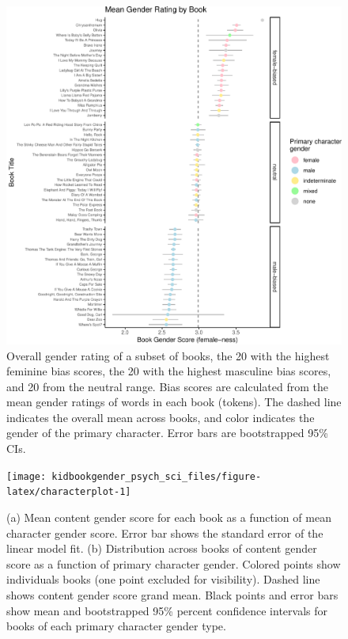 \documentclass[
  english,
  ,man,floatsintext]{apa6}
\begin{document}
\begin{figure}[b]
\includegraphics{kidbookgender_psych_sci_files/figure-latex/bookforest-1} \caption{Overall gender rating of  a subset of books, the 20 with the highest feminine bias scores, the 20 with the highest masculine bias scores, and 20 from the neutral range. Bias scores are calculated from the mean gender ratings of words in each book (tokens). The dashed line indicates the overall mean across books, and color indicates the gender of the primary character. Error bars are bootstrapped 95\% CIs.}\label{fig:bookforest}
\end{figure}

\begin{figure}[t!]
\texttt{[image: kidbookgender\_psych\_sci\_files/figure-latex/characterplot-1]} \caption{(a) Mean content gender score for each book as a function of mean character gender score. Error bar shows the standard error of the linear model fit.  (b) Distribution across books of content gender score as a function of primary character gender. Colored points show individuals books (one point excluded for visibility). Dashed line shows content gender score grand mean. Black points and error bars show mean and bootstrapped 95\% percent confidence intervals for books of each primary character gender type.}\label{fig:characterplot}
\end{figure}
\end{document}
